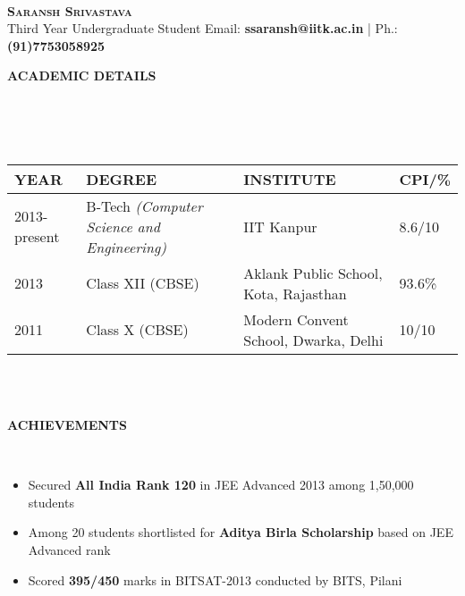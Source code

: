 \documentclass[a4paper,10pt]{article}
\newcommand{\isep}{-2 pt}
\newcommand{\lsep}{-0.5cm}
\newcommand{\resheading}[1]{{\small \colorbox{mygrey}{\begin{minipage}{0.975\textwidth}{\textbf{#1 \vphantom{p\^{E}}}}\end{minipage}}}}
\begin{document}
\hspace{0.5cm}\\[-0.2cm]

\textbf{\Huge \textsc{Saransh Srivastava}}\\
\indent Third Year Undergraduate Student\hfill
Email: \textbf{ssaransh@iitk.ac.in} |
Ph.: \textbf{(91)7753058925} \\

\resheading{\textbf{ACADEMIC DETAILS} }\\[\lsep]
\\ \\
\indent \begin{tabular}{ L{3cm} L{7cm} L{8cm} L{1.2cm} }
\hline
\textbf{YEAR} & \textbf{DEGREE} & \textbf{INSTITUTE}  & \textbf{CPI/\%} \\
\hline

2013-present & B-Tech \emph{(Computer Science and Engineering)} & IIT Kanpur & 8.6/10 \\
2013 & Class XII (CBSE) & Aklank Public School, Kota, Rajasthan  & 93.6\% \\
2011 & Class X (CBSE) & Modern Convent School, Dwarka, Delhi & 10/10 \\
\hline
\end{tabular}
\\ \\


\resheading{\textbf{ACHIEVEMENTS} }\\[\lsep]
\begin{itemize}\itemsep \isep
\item \noindent Secured \textbf{All India Rank 120} in JEE Advanced 2013 among 1,50,000 students
\item \noindent Among 20 students shortlisted for \textbf{Aditya Birla Scholarship} based on JEE Advanced rank
\item \noindent Scored \textbf{395/450} marks in BITSAT-2013 conducted by BITS, Pilani
\end{itemize}
\end{document}
